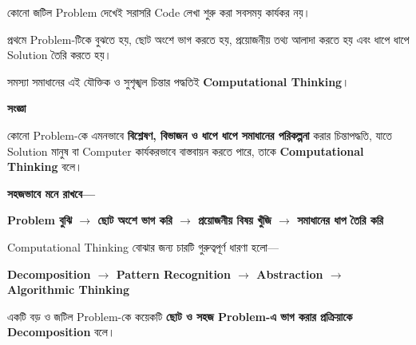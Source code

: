 
কোনো জটিল Problem দেখেই সরাসরি Code লেখা শুরু করা সবসময়
কার্যকর নয়।

প্রথমে Problem-টিকে বুঝতে হয়, ছোট অংশে ভাগ করতে হয়,
প্রয়োজনীয় তথ্য আলাদা করতে হয় এবং ধাপে ধাপে Solution
তৈরি করতে হয়।

সমস্যা সমাধানের এই যৌক্তিক ও সুশৃঙ্খল চিন্তার পদ্ধতিই
\textbf{Computational Thinking}।


\begin{definitionbox}

\textbf{\color{darkTeal}সংজ্ঞা}

কোনো Problem-কে এমনভাবে
\textbf{বিশ্লেষণ, বিভাজন ও ধাপে ধাপে সমাধানের পরিকল্পনা}
করার চিন্তাপদ্ধতি, যাতে Solution মানুষ বা Computer
কার্যকরভাবে বাস্তবায়ন করতে পারে, তাকে
\textbf{Computational Thinking} বলে।

\end{definitionbox}

\textbf{সহজভাবে মনে রাখবে—}

\begin{center}

\textbf{
Problem বুঝি
\(\longrightarrow\)
ছোট অংশে ভাগ করি
\(\longrightarrow\)
প্রয়োজনীয় বিষয় খুঁজি
\(\longrightarrow\)
সমাধানের ধাপ তৈরি করি
}

\end{center}


Computational Thinking বোঝার জন্য চারটি গুরুত্বপূর্ণ ধারণা হলো—

\begin{center}

\textbf{
Decomposition
\(\longrightarrow\)
Pattern Recognition
\(\longrightarrow\)
Abstraction
\(\longrightarrow\)
Algorithmic Thinking
}

\end{center}


\begin{definitionbox}

একটি বড় ও জটিল Problem-কে কয়েকটি
\textbf{ছোট ও সহজ Problem-এ ভাগ করার প্রক্রিয়াকে}
\textbf{Decomposition} বলে।

\end{definitionbox}

